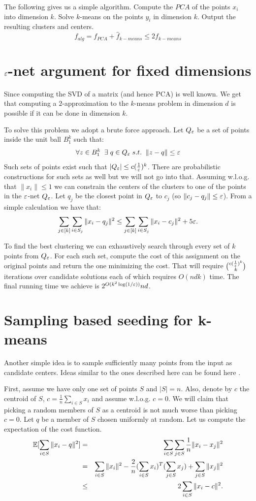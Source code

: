 \documentclass{article}
\begin{document}
The following gives us a simple algorithm. Compute the $PCA$ of the points $x_i$ into dimension $k$.
Solve $k$-means on the points $y_i$ in dimension $k$. Output the resulting clusters and centers.
\[
f_{alg} = f_{PCA} + \hat{f}_{k-means} \le 2f_{k-means}
\]

\section{$\varepsilon$-net argument for fixed dimensions}
Since computing the SVD of a matrix (and hence PCA) is well known. 
We get that computing a $2$-approximation to 
the $k$-means problem in dimension $d$ is possible if it can be done in dimension $k$.

To solve this problem we adopt a brute force approach.
Let $Q_{\varepsilon}$ be a set of points inside the unit ball $B^{k}_{1}$ such that:
\[
\forall z \in B^{k}_{1} \;\; \exists \; q \in Q_{\varepsilon} \; s.t. \;\; \|z - q\| \le \varepsilon
\]
Such sets of points exist such that  $|Q_{\varepsilon}| \le c(\frac{1}{\varepsilon})^k$. There are 
probabilistic constructions for such sets as well but we will not go into that.
Assuming w.l.o.g. that $\|x_i\| \le 1$ we can constrain the centers of 
the clusters to one of the points in the $\varepsilon$-net $Q_{\varepsilon}$.
Let $q_j$ be the closest point in $Q_{\varepsilon}$ to $c_j$ (so $\|c_j - q_j \| \le \varepsilon$).
From a simple calculation we have that:
\[
\sum_{j \in [k]} \sum_{i \in S_j} \|x_i - q_j \|^2 \le  \sum_{j \in [k]} \sum_{i \in S_j} \|x_i - c_j \|^2 + 5\varepsilon.
\]
 
To find the best clustering we can exhaustively search through every set of $k$ points from $Q_{\varepsilon}$.
For each such set, compute the cost of this assignment on the original points and return the one minimizing the cost.
That will require ${c(\frac{1}{\varepsilon})^k \choose k}$ iterations over candidate solutions each of which requires $O(ndk)$ time. 
The final running time we achieve is $2^{O(k^2\log(1/\varepsilon))}nd$. 


\section{Sampling based seeding for k-means}
Another simple idea is to sample sufficiently many points from the input as candidate centers.
Ideas similar to the ones described here can be found here \cite{ZhaHDGS01}.

First, assume we have only one set of points $S$ and $|S|=n$. 
Also, denote by $c$ the centroid of $S$, $c = \frac{1}{n}\sum_{i \in S} x_i$ and assume w.l.o.g. $c=0$.
We will claim that picking a random members of $S$ as a centroid is not much worse than
picking $c=0$.
Let $q$ be a member of $S$ chosen uniformly at random.
Let us compute the expectation of the cost function.
\begin{eqnarray}
{\mathbb E}[\sum_{i \in S} \|x_i - q\|^2] &=& \sum_{i \in S} \sum_{j \in S} \frac{1}{n}\|x_i - x_j\|^2  \\
&=& \sum_{i \in S} \|x_i\|^2  - \frac{2}{n}(\sum_{i \in S} x_i)^T(\sum_{j \in S} x_j) + \sum_{j \in S} \|x_j\|^2 \\
&\le& 2 \sum_{i \in S}  \|x_i - c\|^2.
\end{eqnarray}
\end{document}
